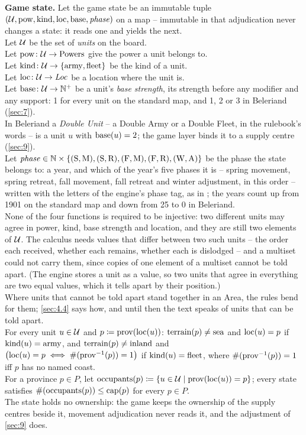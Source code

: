\documentclass[12pt,a4paper]{article}
\begin{document}
\textbf{Game state.} Let the game state be an immutable tuple $(\mathcal{U}, \operatorname{pow}, \operatorname{kind}, \operatorname{loc}, \operatorname{base}, \mathit{phase})$ on a map -- immutable in that adjudication never changes a state: it reads one and yields the next.\\
Let $\mathcal{U}$ be the set of \emph{units} on the board.\\
Let $\operatorname{pow}\colon \mathcal{U} \to \mathrm{Powers}$ give the power a unit belongs to.\\
Let $\operatorname{kind}\colon \mathcal{U} \to \{\mathrm{army}, \mathrm{fleet}\}$ be the kind of a unit.\\
Let $\operatorname{loc}\colon \mathcal{U} \to \mathit{Loc}$ be a location where the unit is.\\
Let $\operatorname{base}\colon \mathcal{U} \to \mathbb{N}^{+}$ be a unit's \emph{base strength}, its strength before any modifier and any support: 1 for every unit on the standard map, and 1, 2 or 3 in Beleriand (\cref{sec:7}).\\
In Beleriand a \emph{Double Unit} -- a Double Army or a Double Fleet, in the rulebook's words -- is a unit $u$ with $\operatorname{base}(u) = 2$; the game layer binds it to a supply centre (\cref{sec:9}).\\
Let $\mathit{phase} \in \mathbb{N} \times \{(\mathrm{S}, \mathrm{M}), (\mathrm{S}, \mathrm{R}), (\mathrm{F}, \mathrm{M}), (\mathrm{F}, \mathrm{R}), (\mathrm{W}, \mathrm{A})\}$ be the phase the state belongs to: a year, and which of the year's five phases it is -- spring movement, spring retreat, fall movement, fall retreat and winter adjustment, in this order -- written with the letters of the engine's phase tag, as in ; the years count up from 1901 on the standard map and down from 25 to 0 in Beleriand.\\
None of the four functions is required to be injective: two different units may agree in power, kind, base strength and location, and they are still two elements of $\mathcal{U}$.
The calculus needs values that differ between two such units -- the order each received, whether each remains, whether each is dislodged -- and a multiset could not carry them, since copies of one element of a multiset cannot be told apart.
(The engine stores a unit as a value, so two units that agree in everything are two equal values, which it tells apart by their position.)\\
Where units that cannot be told apart stand together in an Area, the rules bend for them; \cref{sec:4.4} says how, and until then the text speaks of units that can be told apart.\\
For every unit $u \in \mathcal{U}$ and $p \coloneqq \operatorname{prov}(\operatorname{loc}(u))$: $\operatorname{terrain}(p) \ne \mathrm{sea}$ and $\operatorname{loc}(u) = p$ if $\operatorname{kind}(u) = \mathrm{army}$, and $\operatorname{terrain}(p) \ne \mathrm{inland}$ and $\bigl(\operatorname{loc}(u) = p \iff \#(\operatorname{prov}^{-1}(p)) = 1\bigr)$ if $\operatorname{kind}(u) = \mathrm{fleet}$, where $\#(\operatorname{prov}^{-1}(p)) = 1$ iff $p$ has no named coast.\\
For a province $p \in P$, let $\operatorname{occupants}(p) \coloneqq \{u \in \mathcal{U} \mid \operatorname{prov}(\operatorname{loc}(u)) = p\}$; every state satisfies $\#(\operatorname{occupants}(p)) \le \operatorname{cap}(p)$ for every $p \in P$.\\
The state holds no ownership: the game keeps the ownership of the supply centres beside it, movement adjudication never reads it, and the adjustment of \cref{sec:9} does.
\end{document}
